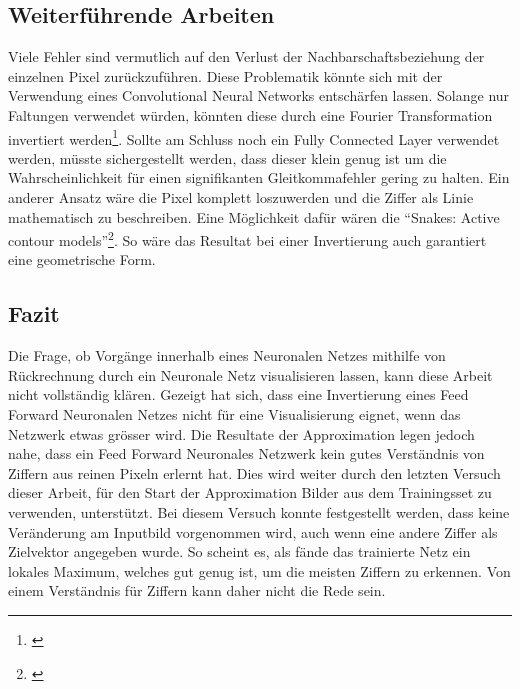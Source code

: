 \documentclass[Interploate_hadwritten_Digits.tex]{subfiles}
\begin{document}
	\subsection{Weiterführende Arbeiten}
	Viele Fehler sind vermutlich auf den Verlust der Nachbarschaftsbeziehung der einzelnen Pixel zurückzuführen. Diese Problematik könnte sich mit der Verwendung eines Convolutional Neural Networks entschärfen lassen. Solange nur Faltungen verwendet würden, könnten diese durch eine Fourier Transformation invertiert werden\footnote{\cite{weisstein-convolution_theorem}}. Sollte am Schluss noch ein Fully Connected Layer verwendet werden, müsste sichergestellt werden, dass dieser klein genug ist um die Wahrscheinlichkeit für einen signifikanten Gleitkommafehler gering zu halten.
	Ein anderer Ansatz wäre die Pixel komplett loszuwerden und die Ziffer als Linie mathematisch zu beschreiben. Eine Möglichkeit dafür wären die ``Snakes: Active contour models''\footnote{\cite{kass-snake}}. So wäre das Resultat bei einer Invertierung auch garantiert eine geometrische Form.
	
	\subsection{Fazit}
	Die Frage, ob Vorgänge innerhalb eines Neuronalen Netzes mithilfe von Rückrechnung durch ein Neuronale Netz visualisieren lassen, kann diese Arbeit nicht vollständig klären. Gezeigt hat sich, dass eine Invertierung eines Feed Forward Neuronalen Netzes nicht für eine Visualisierung eignet, wenn das Netzwerk etwas grösser wird. Die Resultate der Approximation legen jedoch nahe, dass ein Feed Forward Neuronales Netzwerk kein gutes Verständnis von Ziffern aus reinen Pixeln erlernt hat. Dies wird weiter durch den letzten Versuch dieser Arbeit, für den Start der Approximation Bilder aus dem Trainingsset zu verwenden, unterstützt. Bei diesem Versuch konnte festgestellt werden, dass keine Veränderung am Inputbild vorgenommen wird, auch wenn eine andere Ziffer als Zielvektor angegeben wurde. So scheint es, als fände das trainierte Netz ein lokales Maximum, welches gut genug ist, um die meisten Ziffern zu erkennen. Von einem Verständnis für Ziffern kann daher nicht die Rede sein.
	
\end{document}
